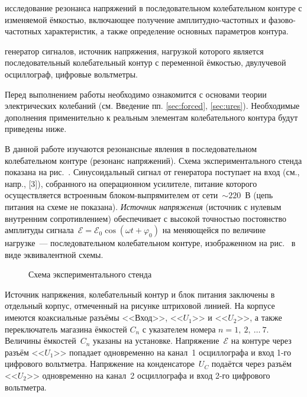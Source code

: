 \label{lab:322}

\begin{lab:aim}
     исследование резонанса напряжений в последовательном колебательном контуре
с изменяемой ёмкостью, включающее получение амплитудно-частотных и
фазово-частотных характеристик, а также определение основных параметров контура.
\end{lab:aim}

\begin{lab:equipment}
	генератор сигналов, источник напряжения, нагрузкой которого является
последовательный колебательный контур с переменной ёмкостью, двулучевой
осциллограф, цифровые вольтметры.
\end{lab:equipment}

Перед выполнением работы необходимо ознакомится с основами теории электрических  
колебаний (см. Введение пп. \ref{sec:forced}, \ref{sec:ures}).
Необходимые дополнения применительно к реальным элементам колебательного
контура будут приведены ниже.

\experiment

В данной работе изучаются резонансные явления в последовательном колебательном
контуре (резонанс напряжений). 
Схема экспериментального стенда показана на рис.~.
Синусоидальный сигнал от генератора поступает на вход  (см., напр., [3]), собранного на
операционном усилителе, питание которого осуществляется встроенным
блоком-выпрямителем от сети~$\sim220$~В (цепь питания на схеме не показана).
\emph{Источник напряжения} (источник с нулевым внутренним
сопротивлением) обеспечивает с высокой точностью постоянство
амплитуды сигнала~$\mathcal{E}=\mathcal{E}_0\cos(\omega t+\varphi_0)$ на
меняющейся по величине нагрузке~--- последовательном колебательном контуре,
изображенном на рис.~ в виде эквивалентной схемы. 

\begin{figure}[h!]
    \centering
	\caption{Схема экспериментального стенда}
\end{figure}

Источник
напряжения, колебательный контур и блок питания заключены в отдельный корпус,
отмеченный на рисунке штриховой линией.
На корпусе имеются коаксиальные разъёмы <<Вход>>, <<$U_1$>> и <<$U_2$>>, а также
переключатель магазина ёмкостей $C_n$ с указателем номера $n=1,~2,~\ldots~7.$
Величины ёмкостей~$C_n$ указаны на установке. 
Напряжение~$\mathcal{E}$ на контуре через разъём <<$U_1$>> попадает одновременно 
на канал~1 осциллографа и вход 1-го цифрового вольтметра. Напряжение на конденсаторе~$U_C$ 
подаётся через разъём <<$U_2$>> одновременно на канал~2 осциллографа и
вход 2-го цифрового вольтметра.

